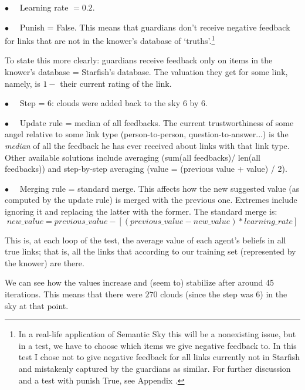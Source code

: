 \documentclass[11pt]{article}
\begin{document}
$\bullet \quad$ Learning rate $= 0.2$.

$\bullet \quad$ Punish = False. This means that guardians don't receive negative feedback for links that are not in the knower's database of `truths'.\footnote{In a real-life application of Semantic Sky this will be a nonexisting issue, but in a test, we have to choose which items we give negative feedback to. In this test I chose not to give negative feedback for all links currently not in Starfish and mistakenly captured by the guardians as similar. For further discussion and a test with punish True, see Appendix .}

To state this more clearly: guardians receive feedback only on items in the knower's database = Starfish's database. The valuation they get for some link, namely, is $1 - $ their current rating of the link.

$\bullet \quad$ Step = 6: clouds were added back to the sky 6 by 6.

$\bullet \quad$ Update rule = median of all feedbacks. The current trustworthiness of some angel relative to some link type (person-to-person, question-to-answer...) is the \emph{median} of all the feedback he has ever received about links with that link type. Other available solutions include averaging (sum(all feedbacks)/ len(all feedbacks)) and step-by-step averaging (value = (previous value + value) / 2).

$\bullet \quad$ Merging rule = standard merge. This affects how the new suggested value (as computed by the update rule) is merged with the previous one. Extremes include ignoring it and replacing the latter with the former. The standard merge is:
\[new\_value = previous\_value - [(previous\_value - new\_value) * learning\_rate] \]

This is, at each loop of the test, the average value of each agent's beliefs in all true links; that is, all the links that according to our training set (represented by the knower) are there.

We can see how the values increase and (seem to) stabilize after around 45 iterations. This means that there were $270$ clouds (since the step was 6) in the sky at that point.
\end{document}
